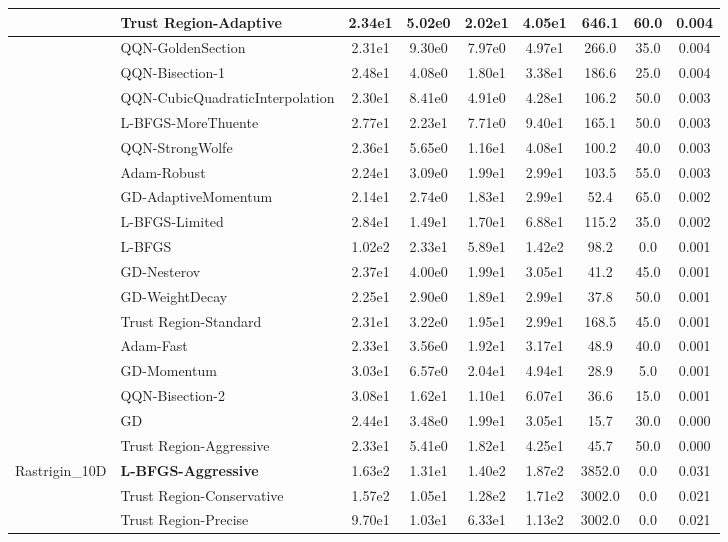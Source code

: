 \documentclass{article}
\begin{document}
\begin{longtable}{|l|l|c|c|c|c|c|c|c|}
\hline
 & Trust Region-Adaptive & 2.34e1 & 5.02e0 & 2.02e1 & 4.05e1 & 646.1 & 60.0 & 0.004 \\
\hline
 & QQN-GoldenSection & 2.31e1 & 9.30e0 & 7.97e0 & 4.97e1 & 266.0 & 35.0 & 0.004 \\
\hline
 & QQN-Bisection-1 & 2.48e1 & 4.08e0 & 1.80e1 & 3.38e1 & 186.6 & 25.0 & 0.004 \\
\hline
 & QQN-CubicQuadraticInterpolation & 2.30e1 & 8.41e0 & 4.91e0 & 4.28e1 & 106.2 & 50.0 & 0.003 \\
\hline
 & L-BFGS-MoreThuente & 2.77e1 & 2.23e1 & 7.71e0 & 9.40e1 & 165.1 & 50.0 & 0.003 \\
\hline
 & QQN-StrongWolfe & 2.36e1 & 5.65e0 & 1.16e1 & 4.08e1 & 100.2 & 40.0 & 0.003 \\
\hline
 & Adam-Robust & 2.24e1 & 3.09e0 & 1.99e1 & 2.99e1 & 103.5 & 55.0 & 0.003 \\
\hline
 & GD-AdaptiveMomentum & 2.14e1 & 2.74e0 & 1.83e1 & 2.99e1 & 52.4 & 65.0 & 0.002 \\
\hline
 & L-BFGS-Limited & 2.84e1 & 1.49e1 & 1.70e1 & 6.88e1 & 115.2 & 35.0 & 0.002 \\
\hline
 & L-BFGS & 1.02e2 & 2.33e1 & 5.89e1 & 1.42e2 & 98.2 & 0.0 & 0.001 \\
\hline
 & GD-Nesterov & 2.37e1 & 4.00e0 & 1.99e1 & 3.05e1 & 41.2 & 45.0 & 0.001 \\
\hline
 & GD-WeightDecay & 2.25e1 & 2.90e0 & 1.89e1 & 2.99e1 & 37.8 & 50.0 & 0.001 \\
\hline
 & Trust Region-Standard & 2.31e1 & 3.22e0 & 1.95e1 & 2.99e1 & 168.5 & 45.0 & 0.001 \\
\hline
 & Adam-Fast & 2.33e1 & 3.56e0 & 1.92e1 & 3.17e1 & 48.9 & 40.0 & 0.001 \\
\hline
 & GD-Momentum & 3.03e1 & 6.57e0 & 2.04e1 & 4.94e1 & 28.9 & 5.0 & 0.001 \\
\hline
 & QQN-Bisection-2 & 3.08e1 & 1.62e1 & 1.10e1 & 6.07e1 & 36.6 & 15.0 & 0.001 \\
\hline
 & GD & 2.44e1 & 3.48e0 & 1.99e1 & 3.05e1 & 15.7 & 30.0 & 0.000 \\
\hline
 & Trust Region-Aggressive & 2.33e1 & 5.41e0 & 1.82e1 & 4.25e1 & 45.7 & 50.0 & 0.000 \\
Rastrigin\_10D & \textbf{L-BFGS-Aggressive} & 1.63e2 & 1.31e1 & 1.40e2 & 1.87e2 & 3852.0 & 0.0 & 0.031 \\
\hline
 & Trust Region-Conservative & 1.57e2 & 1.05e1 & 1.28e2 & 1.71e2 & 3002.0 & 0.0 & 0.021 \\
\hline
 & Trust Region-Precise & 9.70e1 & 1.03e1 & 6.33e1 & 1.13e2 & 3002.0 & 0.0 & 0.021 \\

\end{longtable}
\end{document}
